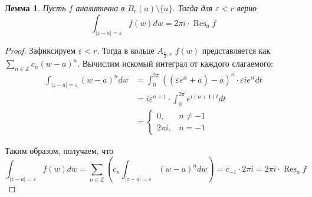 \documentclass[12pt]{article}
\newcommand{\Z}{\mathbb{Z}}
\newcommand{\Res}{\operatorname{Res}}
\newcounter{cnt}
\theoremstyle{thmnote}
\newtheorem{lemma}[cnt]{Лемма}
\theoremstyle{remark}
\theoremstyle{defnote}
\begin{document}
\begin{lemma}
    Пусть $f$ аналитична в $B_r(a) \setminus \{a\}$. Тогда для $\varepsilon < r$ верно
    \begin{equation*}
        \int_{|z - a| = \varepsilon} f(w)dw = 2 \pi i \cdot \Res_a f
    \end{equation*}
\end{lemma}
\begin{proof}
    Зафиксируем $\varepsilon < r$. Тогда в кольце $A_{\frac{\varepsilon}{2}, r}$ $f(w)$ представляется как $\sum_{n \in \Z} c_n (w - a)^n$. Вычислим искомый интеграл от каждого слагаемого:
    \begin{align*}
        \int_{|z - a| = \varepsilon} (w - a)^n dw &= \int_{0}^{2 \pi} ((\varepsilon e^{it} + a) - a)^n \cdot \varepsilon i e^{it} dt \\
        &= i \varepsilon^{n+1} \cdot \int_{0}^{2 \pi} e^{i (n+1) t} dt \\
        &= \begin{cases}
            0, & n \neq -1 \\
            2 \pi i, & n = -1
        \end{cases}
    \end{align*}

    Таким образом, получаем, что
    \begin{equation*}
        \int_{|z - a| = \varepsilon} f(w)dw = \sum_{n \in \Z} \left( c_n \int_{|z - a| = \varepsilon} (w - a)^n dw \right) = c_{-1} \cdot 2 \pi i = 2 \pi i \cdot \Res_a f
    \end{equation*}
\end{proof}
\end{document}
